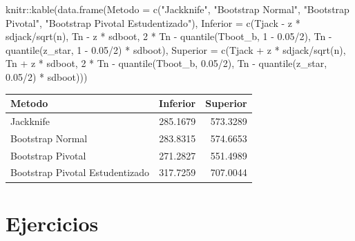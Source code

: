 \documentclass[
  12pt,
]{book}
\newenvironment{Shaded}{\begin{snugshade}}{\end{snugshade}}
\newcommand{\AttributeTok}[1]{\textcolor[rgb]{0.77,0.63,0.00}{#1}}
\newcommand{\DecValTok}[1]{\textcolor[rgb]{0.00,0.00,0.81}{#1}}
\newcommand{\FloatTok}[1]{\textcolor[rgb]{0.00,0.00,0.81}{#1}}
\newcommand{\FunctionTok}[1]{\textcolor[rgb]{0.00,0.00,0.00}{#1}}
\newcommand{\NormalTok}[1]{#1}
\newcommand{\SpecialCharTok}[1]{\textcolor[rgb]{0.00,0.00,0.00}{#1}}
\newcommand{\StringTok}[1]{\textcolor[rgb]{0.31,0.60,0.02}{#1}}
\begin{document}
\begin{Shaded}
\begin{Highlighting}[]
\NormalTok{knitr}\SpecialCharTok{::}\FunctionTok{kable}\NormalTok{(}\FunctionTok{data.frame}\NormalTok{(}\AttributeTok{Metodo =} \FunctionTok{c}\NormalTok{(}\StringTok{"Jackknife"}\NormalTok{, }\StringTok{"Bootstrap Normal"}\NormalTok{,}
    \StringTok{"Bootstrap Pivotal"}\NormalTok{, }\StringTok{"Bootstrap Pivotal Estudentizado"}\NormalTok{),}
    \AttributeTok{Inferior =} \FunctionTok{c}\NormalTok{(Tjack }\SpecialCharTok{{-}}\NormalTok{ z }\SpecialCharTok{*}\NormalTok{ sdjack}\SpecialCharTok{/}\FunctionTok{sqrt}\NormalTok{(n), Tn }\SpecialCharTok{{-}}\NormalTok{ z }\SpecialCharTok{*}
\NormalTok{        sdboot, }\DecValTok{2} \SpecialCharTok{*}\NormalTok{ Tn }\SpecialCharTok{{-}} \FunctionTok{quantile}\NormalTok{(Tboot\_b, }\DecValTok{1} \SpecialCharTok{{-}} \FloatTok{0.05}\SpecialCharTok{/}\DecValTok{2}\NormalTok{),}
\NormalTok{        Tn }\SpecialCharTok{{-}} \FunctionTok{quantile}\NormalTok{(z\_star, }\DecValTok{1} \SpecialCharTok{{-}} \FloatTok{0.05}\SpecialCharTok{/}\DecValTok{2}\NormalTok{) }\SpecialCharTok{*}\NormalTok{ sdboot),}
    \AttributeTok{Superior =} \FunctionTok{c}\NormalTok{(Tjack }\SpecialCharTok{+}\NormalTok{ z }\SpecialCharTok{*}\NormalTok{ sdjack}\SpecialCharTok{/}\FunctionTok{sqrt}\NormalTok{(n), Tn }\SpecialCharTok{+}\NormalTok{ z }\SpecialCharTok{*}
\NormalTok{        sdboot, }\DecValTok{2} \SpecialCharTok{*}\NormalTok{ Tn }\SpecialCharTok{{-}} \FunctionTok{quantile}\NormalTok{(Tboot\_b, }\FloatTok{0.05}\SpecialCharTok{/}\DecValTok{2}\NormalTok{),}
\NormalTok{        Tn }\SpecialCharTok{{-}} \FunctionTok{quantile}\NormalTok{(z\_star, }\FloatTok{0.05}\SpecialCharTok{/}\DecValTok{2}\NormalTok{) }\SpecialCharTok{*}\NormalTok{ sdboot)))}
\end{Highlighting}
\end{Shaded}

\begin{longtable}[]{@{}lrr@{}}
\toprule()
Metodo & Inferior & Superior \\
\midrule()
\endhead
Jackknife & 285.1679 & 573.3289 \\
Bootstrap Normal & 283.8315 & 574.6653 \\
Bootstrap Pivotal & 271.2827 & 551.4989 \\
Bootstrap Pivotal Estudentizado & 317.7259 & 707.0044 \\
\bottomrule()
\end{longtable}

\hypertarget{ejercicios-1}{%
\section{Ejercicios}\label{ejercicios-1}}
\end{document}
